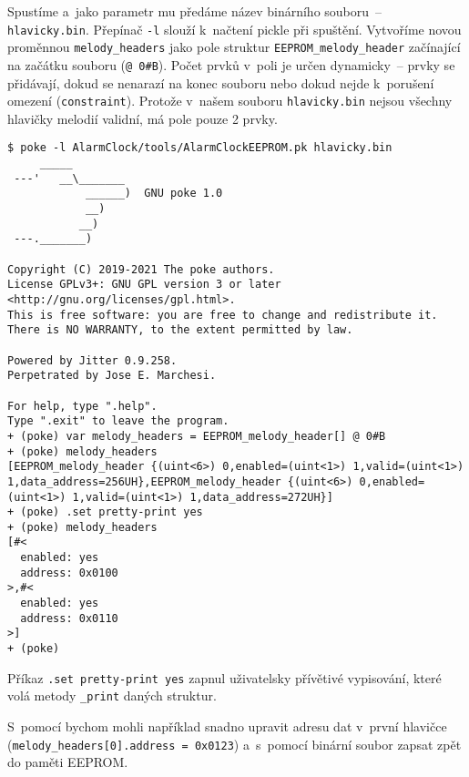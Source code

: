 Spustíme  a~jako parametr mu předáme název binárního souboru~--
\texttt{hlavicky.bin}. Přepínač \texttt{-l} slouží k~načtení pickle při
spuštění. Vytvoříme novou proměnnou \verb|melody_headers| jako pole struktur
\verb|EEPROM_melody_header| začínající na začátku souboru (\verb|@ 0#B|). Počet
prvků v~poli je určen dynamicky~-- prvky se přidávají, dokud se nenarazí na
konec souboru nebo dokud nejde k~porušení omezení (\texttt{constraint}).
Protože v~našem souboru \texttt{hlavicky.bin} nejsou všechny hlavičky melodií
validní, má pole pouze 2 prvky.
\begin{lstlisting}[style=terminal]
$ poke -l AlarmClock/tools/AlarmClockEEPROM.pk hlavicky.bin
     _____
 ---'   __\_______
            ______)  GNU poke 1.0
            __)
           __)
 ---._______)

Copyright (C) 2019-2021 The poke authors.
License GPLv3+: GNU GPL version 3 or later <http://gnu.org/licenses/gpl.html>.
This is free software: you are free to change and redistribute it.
There is NO WARRANTY, to the extent permitted by law.

Powered by Jitter 0.9.258.
Perpetrated by Jose E. Marchesi.

For help, type ".help".
Type ".exit" to leave the program.
+ (poke) var melody_headers = EEPROM_melody_header[] @ 0#B
+ (poke) melody_headers
[EEPROM_melody_header {(uint<6>) 0,enabled=(uint<1>) 1,valid=(uint<1>) 1,data_address=256UH},EEPROM_melody_header {(uint<6>) 0,enabled=(uint<1>) 1,valid=(uint<1>) 1,data_address=272UH}]
+ (poke) .set pretty-print yes
+ (poke) melody_headers
[#<
  enabled: yes
  address: 0x0100
>,#<
  enabled: yes
  address: 0x0110
>]
+ (poke)
\end{lstlisting}
Příkaz \verb|.set pretty-print yes| zapnul uživatelsky přívětivé vypisování,
které volá metody \verb|_print| daných struktur.

S~pomocí  bychom mohli například snadno upravit adresu dat
v~první hlavičce (\lstinline[language=Poke]|melody_headers[0].address = 0x0123|)
a~s~pomocí  binární soubor zapsat zpět do paměti
EEPROM.



